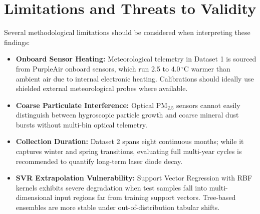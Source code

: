 \documentclass[11pt,a4paper]{article}
\begin{document}
\section{Limitations and Threats to Validity}
Several methodological limitations should be considered when interpreting these findings:
\begin{itemize}
    \item \textbf{Onboard Sensor Heating:} Meteorological telemetry in Dataset 1 is sourced from PurpleAir onboard sensors, which run 2.5 to 4.0\,$^\circ\text{C}$ warmer than ambient air due to internal electronic heating. Calibrations should ideally use shielded external meteorological probes where available.
    \item \textbf{Coarse Particulate Interference:} Optical $\text{PM}_{2.5}$ sensors cannot easily distinguish between hygroscopic particle growth and coarse mineral dust bursts without multi-bin optical telemetry.
    \item \textbf{Collection Duration:} Dataset 2 spans eight continuous months; while it captures winter and spring transitions, evaluating full multi-year cycles is recommended to quantify long-term laser diode decay.
    \item \textbf{SVR Extrapolation Vulnerability:} Support Vector Regression with RBF kernels exhibits severe degradation when test samples fall into multi-dimensional input regions far from training support vectors. Tree-based ensembles are more stable under out-of-distribution tabular shifts.
\end{itemize}

\end{document}
